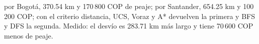 {por Bogotá, 370.54 km y 170\,800 COP de peaje; por Santander, 654.25 km y 100\,200 COP; con el criterio distancia, UCS, Voraz y A* devuelven la primera y BFS y DFS la segunda.}
{Medido: el desvío es 283.71 km más largo y tiene 70\,600 COP menos de peaje.}
